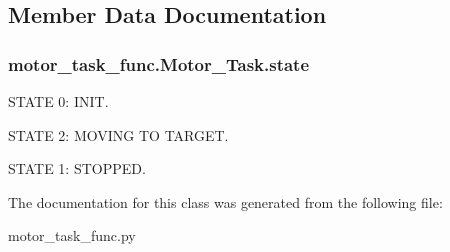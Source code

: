 \subsection{Member Data Documentation}
\subsubsection[{\texorpdfstring{state}{state}}]{\setlength{\rightskip}{0pt plus 5cm}motor\+\_\+task\+\_\+func.\+Motor\+\_\+\+Task.\+state}\hypertarget{classmotor__task__func_1_1Motor__Task_a663cf01c6093dee5df31db371be9210f}{}\label{classmotor__task__func_1_1Motor__Task_a663cf01c6093dee5df31db371be9210f}


S\+T\+A\+TE 0\+: I\+N\+IT. 

S\+T\+A\+TE 2\+: M\+O\+V\+I\+NG TO T\+A\+R\+G\+ET.

S\+T\+A\+TE 1\+: S\+T\+O\+P\+P\+ED. 

The documentation for this class was generated from the following file\+:\begin{DoxyCompactItemize}
\item 
motor\+\_\+task\+\_\+func.\+py\end{DoxyCompactItemize}
